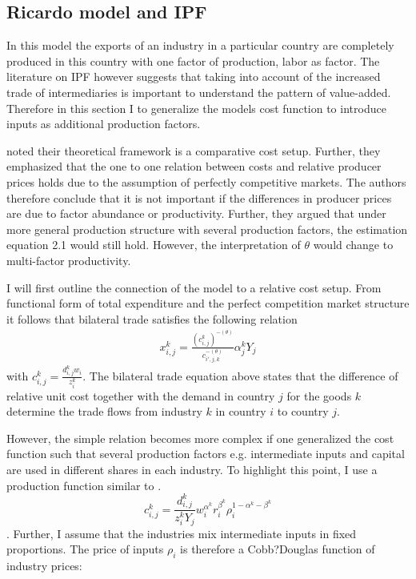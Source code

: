 \subsection{Ricardo model and IPF}
In this model the exports of an industry in a particular country are completely produced in this country with one factor of production, labor as factor. The literature on IPF however suggests that taking into account of the increased trade of intermediaries is important to understand the pattern of value-added. Therefore in this section I   to generalize the models cost function to introduce inputs as additional production factors. \par 
\textcite{costinot} noted their theoretical framework is a comparative cost setup. Further, they emphasized that the one to one relation between costs and relative producer prices holds due to the assumption of perfectly competitive markets. The authors therefore conclude that it is not important if the differences in producer prices are due to factor abundance or productivity. Further, they argued that under more general production structure with several production factors, the estimation equation 2.1 would still hold. However, the interpretation of $\theta$ would change to multi-factor productivity. \par  I will first outline the connection of the model to a relative cost setup. 
From  functional form of total expenditure and the perfect competition market structure it follows that bilateral trade satisfies the following relation \begin{align}
 x^k_{i,j}= \frac{(c^k_{i,j})^{ -(\theta) } } { c_{i',j,k}^{-(\theta) } }  \alpha^k_j Y_j 
\end{align} with $c^k_{i,j}=\frac{d^k_{i,j} w_i}{z_i^k}$.
 The bilateral trade equation above states that the difference of relative unit cost together with the demand in country $j$ for the goods $k$ determine the trade flows from industry $k$ in country $i$ to country $j$. 
 \par 
 However, the simple relation becomes more complex if one generalized the cost function such that several production factors e.g. intermediate inputs and capital are used in different shares in each industry. To highlight this point, I use a production function similar to \textcite{Shikher}.  \[ c^k_{i,j}=\frac{d^k_{i,j}}{z_{i}^k Y_j} w^{\alpha^k}_i r^{\beta^k}_i \rho^{1-\alpha^k-\beta^k}_{i} \]. Further, I assume that the industries mix intermediate inputs in fixed proportions. The price of inputs $\rho_i$ is therefore a Cobb?Douglas function of industry prices:
